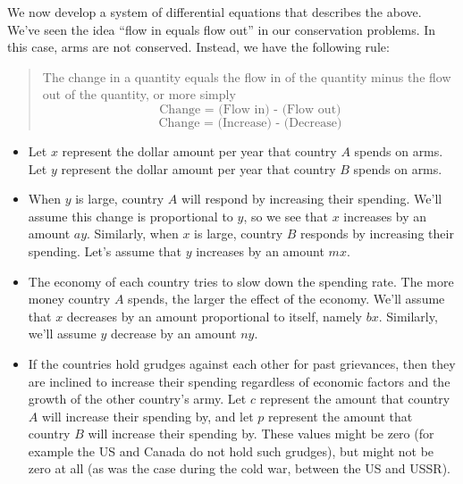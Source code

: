  We now develop a system of differential equations that describes the above. We've seen the idea ``flow in equals flow out'' in our conservation problems.  In this case, arms are not conserved.  Instead, we have the following rule:
\begin{quote}
 The change in a quantity equals the flow in of the quantity minus the flow out of the quantity, or more simply 
$$\text{Change = (Flow in) - (Flow out)}$$
$$\text{Change = (Increase) - (Decrease)}$$
\end{quote}
\begin{itemize}
\item Let $x$ represent the dollar amount per year that country $A$ spends on arms. Let $y$ represent the dollar amount per year that country $B$ spends on arms.  
\item When $y$ is large, country $A$ will respond by increasing their spending.  
We'll assume this change is proportional to $y$, so we see that $x$ increases by an amount $ay$. 
 Similarly, when $x$ is large, country $B$ responds by increasing their spending. Let's assume that $y$ increases by an amount $mx$.
\item The economy of each country tries to slow down the spending rate.  The more money country $A$ spends, the larger the effect of the economy.  We'll assume that $x$ decreases by an amount proportional to itself, namely $bx$.  Similarly, we'll assume $y$ decrease by an amount $ny$.
\item If the countries hold grudges against each other for past grievances, then they are inclined to increase their spending regardless of economic factors and the growth of the other country's army.  Let $c$ represent the amount that country $A$ will increase their spending by, and let $p$ represent the amount that country $B$ will increase their spending by. These values might be zero (for example the US and Canada do not hold such grudges), but might not be zero at all (as was the case during the cold war, between the US and USSR).
\end{itemize}

